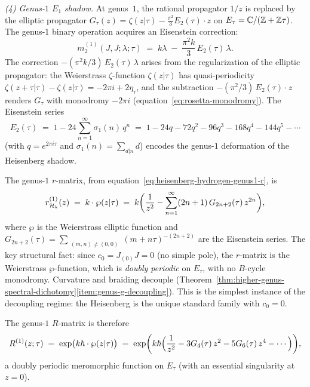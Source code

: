 \begin{computation}
\smallskip
\noindent
\emph{(4) Genus-$1$ $E_1$ shadow.}
At genus~$1$, the rational propagator $1/z$ is replaced by the
elliptic propagator $G_\tau(z) = \zeta(z|\tau) - \tfrac{\pi^2}{3}
E_2(\tau)\cdot z$ on $E_\tau = \mathbb{C}/(\mathbb{Z} + \mathbb{Z}\tau)$.
The genus-$1$ binary operation acquires an Eisenstein correction:
\begin{equation}\label{eq:e1-shadow-genus1-m2}
m_2^{(1)}(J,J;\lambda;\tau)
\;=\;
k\lambda
\;-\;
\frac{\pi^2 k}{3}\, E_2(\tau)\, \lambda.
\end{equation}
The correction $-(\pi^2 k/3)\, E_2(\tau)\, \lambda$ arises from
the regularization of the elliptic propagator: the Weierstrass
$\zeta$-function $\zeta(z|\tau)$ has quasi-periodicity
$\zeta(z+\tau|\tau) - \zeta(z|\tau) = -2\pi i + 2\eta_\tau$,
and the subtraction $-(\pi^2/3)\, E_2(\tau)\cdot z$ renders $G_\tau$
with monodromy $-2\pi i$
(equation~\eqref{eq:rosetta-monodromy}). The Eisenstein series
\begin{equation}\label{eq:e2-expansion}
E_2(\tau)
\;=\;
1 - 24\sum_{n=1}^{\infty} \sigma_1(n)\, q^n
\;=\;
1 - 24q - 72q^2 - 96q^3 - 168q^4 - 144q^5 - \cdots
\end{equation}
(with $q = e^{2\pi i \tau}$ and $\sigma_1(n) = \sum_{d|n} d$)
encodes the genus-$1$ deformation of the Heisenberg shadow.

The genus-$1$ $r$-matrix, from
equation~\eqref{eq:heisenberg-hydrogen-genus1-r}, is
\begin{equation}\label{eq:e1-genus1-r}
r^{(1)}_{\mathcal{H}_k}(z)
\;=\;
k\cdot\wp(z|\tau)
\;=\;
k\biggl(
\frac{1}{z^2}
- \sum_{n=1}^{\infty}(2n+1)\, G_{2n+2}(\tau)\, z^{2n}
\biggr),
\end{equation}
where $\wp$ is the Weierstrass elliptic function and
$G_{2n+2}(\tau) = \sum_{\substack{(m,n) \neq (0,0)}}
(m + n\tau)^{-(2n+2)}$ are the Eisenstein series. The
key structural fact: since $c_0 = J_{(0)}J = 0$ (no simple pole),
the $r$-matrix is the Weierstrass $\wp$-function, which is
\emph{doubly periodic} on $E_\tau$, with no $B$-cycle monodromy.
Curvature and braiding decouple
(Theorem~\ref{thm:higher-genus-spectral-dichotomy}\ref{item:genus-g-decoupling}).
This is the simplest instance of the decoupling
regime: the Heisenberg is the unique standard family with $c_0 = 0$.

The genus-$1$ $R$-matrix is therefore
\begin{equation}\label{eq:e1-genus1-R}
R^{(1)}(z;\tau)
\;=\;
\exp\bigl(k\hbar\cdot\wp(z|\tau)\bigr)
\;=\;
\exp\biggl(
k\hbar\Bigl(
\frac{1}{z^2}
- 3G_4(\tau)\, z^2
- 5G_6(\tau)\, z^4
- \cdots
\Bigr)
\biggr),
\end{equation}
a doubly periodic meromorphic function on $E_\tau$ (with
an essential singularity at $z = 0$).


\end{computation}
